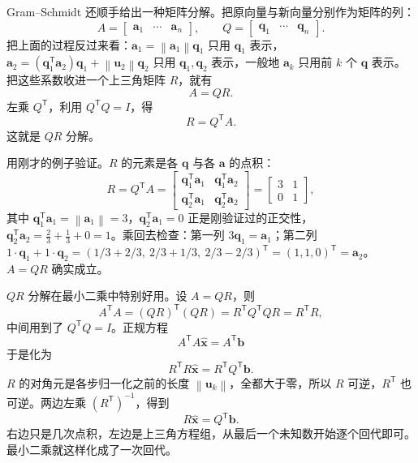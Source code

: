 \documentclass[UTF8,a4paper,12pt]{ctexart}
\numberwithin{equation}{section}
\newcommand{\norm}[1]{\left\lVert #1 \right\rVert}
\newcommand{\trans}{^{\mathsf T}}
\begin{document}
	Gram--Schmidt 还顺手给出一种矩阵分解。把原向量与新向量分别作为矩阵的列：
	\begin{equation}\label{eq:6.92}
	A=
	\begin{bmatrix}
		\bm{a}_1&\cdots&\bm{a}_n
	\end{bmatrix},
	\qquad
	Q=
	\begin{bmatrix}
		\bm{q}_1&\cdots&\bm{q}_n
	\end{bmatrix}.
	\end{equation}
	把上面的过程反过来看：$\bm{a}_1=\norm{\bm{a}_1}\bm{q}_1$ 只用 $\bm{q}_1$ 表示，$\bm{a}_2=(\bm{q}_1\trans\bm{a}_2)\bm{q}_1+\norm{\bm{u}_2}\bm{q}_2$ 只用 $\bm{q}_1,\bm{q}_2$ 表示，一般地 $\bm{a}_k$ 只用前 $k$ 个 $\bm{q}$ 表示。把这些系数收进一个上三角矩阵 $R$，就有
	\begin{equation}\label{eq:6.93}
	\boxed{A=QR.}
	\end{equation}
	左乘 $Q\trans$，利用 $Q\trans Q=I$，得
	\begin{equation}\label{eq:6.94}
	\boxed{R=Q\trans A.}
	\end{equation}
	这就是 $QR$ 分解。

	用刚才的例子验证。$R$ 的元素是各 $\bm{q}$ 与各 $\bm{a}$ 的点积：
	\begin{equation}\label{eq:6.95}
	R=Q\trans A
	=
	\begin{bmatrix}
		\bm{q}_1\trans\bm{a}_1&\bm{q}_1\trans\bm{a}_2\\
		\bm{q}_2\trans\bm{a}_1&\bm{q}_2\trans\bm{a}_2
	\end{bmatrix}
	=
	\begin{bmatrix}
		3&1\\
		0&1
	\end{bmatrix},
	\end{equation}
	其中 $\bm{q}_1\trans\bm{a}_1=\norm{\bm{a}_1}=3$，$\bm{q}_2\trans\bm{a}_1=0$ 正是刚验证过的正交性，$\bm{q}_2\trans\bm{a}_2=\frac{2}{3}+\frac{1}{3}+0=1$。乘回去检查：第一列 $3\bm{q}_1=\bm{a}_1$；第二列 $1\cdot\bm{q}_1+1\cdot\bm{q}_2=(1/3+2/3,\ 2/3+1/3,\ 2/3-2/3)\trans=(1,1,0)\trans=\bm{a}_2$。$A=QR$ 确实成立。

	$QR$ 分解在最小二乘中特别好用。设 $A=QR$，则
	\begin{equation}\label{eq:6.96}
	A\trans A
	=(QR)\trans(QR)
	=R\trans Q\trans QR
	=R\trans R,
	\end{equation}
	中间用到了 $Q\trans Q=I$。正规方程
	\begin{equation}\label{eq:6.97}
	A\trans A\hat{\bm{x}}=A\trans\bm{b}
	\end{equation}
	于是化为
	\begin{equation}\label{eq:6.98}
	R\trans R\hat{\bm{x}}
	=R\trans Q\trans\bm{b}.
	\end{equation}
	$R$ 的对角元是各步归一化之前的长度 $\norm{\bm{u}_k}$，全都大于零，所以 $R$ 可逆，$R\trans$ 也可逆。两边左乘 $(R\trans)^{-1}$，得到
	\begin{equation}\label{eq:6.99}
	\boxed{R\hat{\bm{x}}=Q\trans\bm{b}.}
	\end{equation}
	右边只是几次点积，左边是上三角方程组，从最后一个未知数开始逐个回代即可。最小二乘就这样化成了一次回代。
\end{document}
